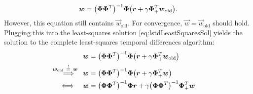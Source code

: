 			\begin{equation}
				\bm{w} = \big( \bm{\Phi} \bm{\Phi}^T \big)^{-1} \bm{\Phi} \big( \bm{r} + \gamma \bm{\Phi}_+^T \bm{w}_\mathrm{old} \big).  \label{eq:lstdLeastSquaresSol}
			\end{equation}
			However, this equation still contains \( \vec{w}_\mathrm{old} \). For convergence, \( \vec{w} = \vec{w}_\mathrm{old} \) should hold. Plugging this into the least-squares solution \eqref{eq:lstdLeastSquaresSol} yields the solution to the complete least-squares temporal differences algorithm:
			\begin{align}
				                                                                                                                                                        &                                                                                                                                        &
				\vec{w}                                                                                                                                                 & = \big( \mat{\Phi} \mat{\Phi}^T \big)^{-1} \mat{\Phi} \big( \vec{r} + \gamma \mat{\Phi}_+^T \vec{w}_\mathrm{old} \big)                 & \nonumber               \\
				\overset{\mathclap{\raisebox{1pt}{\scriptsize \( \vec{w}_\mathrm{old} \,\overset{!}{=}\, \vec{w} \)}}}{\quad\implies}                                   &                                                                                                                                        &
				\vec{w}                                                                                                                                                 & = \big( \mat{\Phi} \mat{\Phi}^T \big)^{-1} \mat{\Phi} \big( \vec{r} + \gamma \mat{\Phi}_+^T \vec{w} \big)                              & \nonumber               \\
				\iff                                                                                                                                                    &                                                                                                                                        &
				\vec{w}                                                                                                                                                 & = \big( \mat{\Phi} \mat{\Phi}^T \big)^{-1} \mat{\Phi} \vec{r} + \gamma \big( \mat{\Phi} \mat{\Phi}^T \big)^{-1} \mat{\Phi}_+^T \vec{w} & \nonumber               \\

\end{align}
